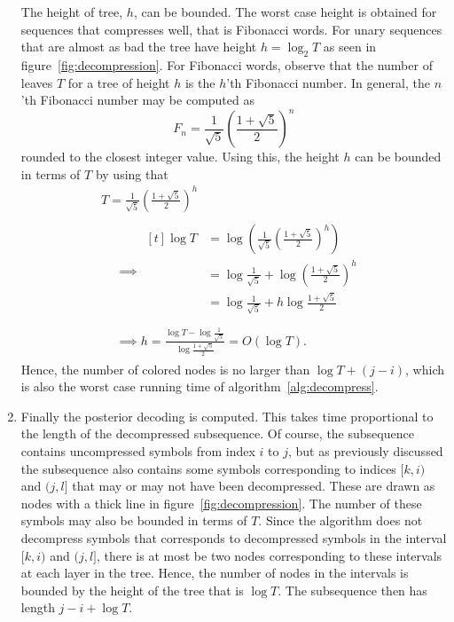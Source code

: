 \begin{enumerate}
  The height of tree, $h$, can be bounded. The worst case height is obtained
  for sequences that compresses well, that is Fibonacci words. For unary
  sequences that are almost as bad the tree have height $h = \log_2 T$ as seen
  in figure~\ref{fig:decompression}. For Fibonacci words, observe that the
  number of leaves $T$ for a tree of height $h$ is the $h$'th Fibonacci number.
  In general, the $n$'th Fibonacci number may be computed as
  \begin{equation*}
    F_n = \frac{1}{\sqrt{5}}
    {\left(
        \frac{1 + \sqrt{5}}{2}
      \right)}^n
  \end{equation*}
  rounded to the closest integer value. Using this, the height $h$ can be
  bounded in terms of $T$ by using that
  \begin{gather*}
      T = \frac{1}{\sqrt{5}} {\left( \frac{1 + \sqrt{5}}{2} \right)}^h \\
      \begin{aligned}
        &\implies
        \begin{aligned}[t]
          \log T & = \log \left( \frac{1}{\sqrt{5}} {\left( \frac{1 + \sqrt{5}}{2} \right)}^h \right) \\
                 & = \log \frac{1}{\sqrt{5}} + \log {\left( \frac{1 + \sqrt{5}}{2} \right)}^h         \\
                 & = \log \frac{1}{\sqrt{5}} + h \log  \frac{1 + \sqrt{5}}{2}                         \\
        \end{aligned} \\
        &\implies h = \frac{\log T - \log \frac{1}{\sqrt{5}}}{\log \frac{1 + \sqrt{5}}{2}} = O\left(\log T\right).
      \end{aligned}
  \end{gather*}
  Hence, the number of colored nodes is no larger than $\log T + (j - i)$,
  which is also the worst case running time of algorithm~\ref{alg:decompress}.

\item Finally the posterior decoding is computed. This takes time proportional
  to the length of the decompressed subsequence. Of course, the subsequence
  contains uncompressed symbols from index $i$ to $j$, but as previously
  discussed the subsequence also contains some symbols corresponding to indices
  $[k, i)$ and $(j, l]$ that may or may not have been decompressed. These are
  drawn as nodes with a thick line in figure~\ref{fig:decompression}. The
  number of these symbols may also be bounded in terms of $T$. Since the
  algorithm does not decompress symbols that corresponds to decompressed
  symbols in the interval $[k, i)$ and $(j, l]$, there is at most be two nodes
  corresponding to these intervals at each layer in the tree. Hence, the number
  of nodes in the intervals is bounded by the height of the tree that is
  $\log T$. The subsequence then has length $j - i + \log T$.


\end{enumerate}
